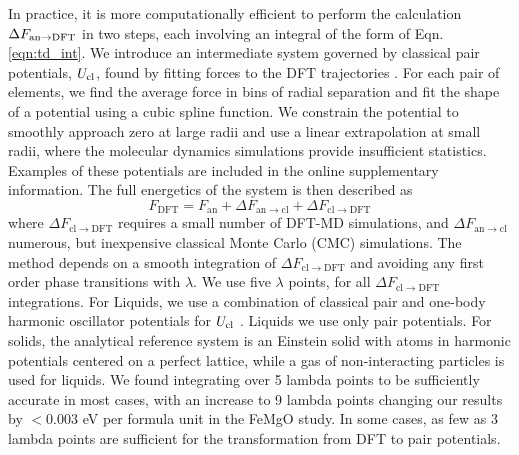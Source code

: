 In practice, it is more computationally efficient to perform the calculation $\Delta
F_{\rm an\to DFT}$ in two steps, each involving an integral of the form of Eqn.
\ref{eqn:td_int}. We introduce an intermediate system governed by classical pair
potentials, $U_{\rm cl}$, found by fitting forces to the DFT trajectories
\citep{Wilson2010,Izvekov2004}. For each pair of elements, we find the average force in bins
of radial separation and fit the shape of a potential using a cubic spline function. We
constrain the potential to smoothly approach zero at large radii and use a linear
extrapolation at small radii, where the molecular dynamics simulations provide
insufficient statistics. Examples of these potentials are included in the online
supplementary information. The full energetics of the system is then described as
\begin{equation} \label{eqn:two_step}
F_{\mathrm{DFT}}=F_{\mathrm{\mathrm{an}}}+\Delta
F_{\mathrm{an} \to \mathrm{cl}}+\Delta F_{\mathrm{cl}\to \mathrm{DFT}}
\end{equation}
where $\Delta F_{\mathrm{cl}\to \mathrm{DFT}}$ requires a small number of DFT-MD
simulations, and $\Delta F_{\mathrm{an} \to \mathrm{cl}}$ numerous, but inexpensive
classical Monte Carlo (CMC) simulations. The method depends on a smooth integration
of $\Delta F_{\mathrm{cl}\to \mathrm{DFT}}$ and avoiding any first order phase
transitions with $\lambda$.  We use five $\lambda$ points, for all $\Delta
F_{\mathrm{cl}\to \mathrm{DFT}}$ integrations. For Liquids, we use a combination of
classical pair and one-body harmonic oscillator potentials for $U_{\rm cl}$
\citep{Wilson2012a,Wahl2013}.  Liquids we use only pair potentials. For solids, the
analytical reference system is an Einstein solid with atoms in harmonic potentials
centered on a perfect lattice, while a gas of non-interacting particles is used for
liquids. We found integrating over 5 lambda points to be sufficiently accurate in
most cases, with an increase to 9 lambda points changing our results by $<0.003$ eV
per formula unit in the FeMgO study. In some cases, as few as 3 lambda points are
sufficient for the transformation from DFT to pair potentials. 


